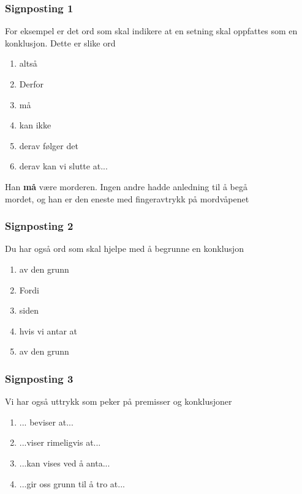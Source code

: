 \documentclass[11pt]{article}
\begin{document}
\subsubsection{Signposting 1}


\vspace{1em}

For eksempel er det ord som skal indikere at en setning skal oppfattes som en konklusjon. Dette er slike ord
\begin{enumerate}
    \item altså
    \item Derfor
    \item må
    \item kan ikke
    \item derav følger det
    \item derav kan vi slutte at...
\end{enumerate}

Han \textbf{må} være morderen. Ingen andre hadde anledning til å begå\\ mordet, og han er den eneste med fingeravtrykk på mordvåpenet

\subsubsection{Signposting 2}

Du har også ord som skal hjelpe med å begrunne en konklusjon

\begin{enumerate}
    \item av den grunn
    \item Fordi
    \item siden
    \item hvis vi antar at
    \item av den grunn
\end{enumerate}


\subsubsection{Signposting 3}

Vi har også uttrykk som peker på premisser og konklusjoner

\begin{enumerate}
    \item ... beviser at...
    \item ...viser rimeligvis at...
    \item ...kan vises ved å anta...
    \item ...gir oss grunn til å tro at...
\end{enumerate}
\end{document}
